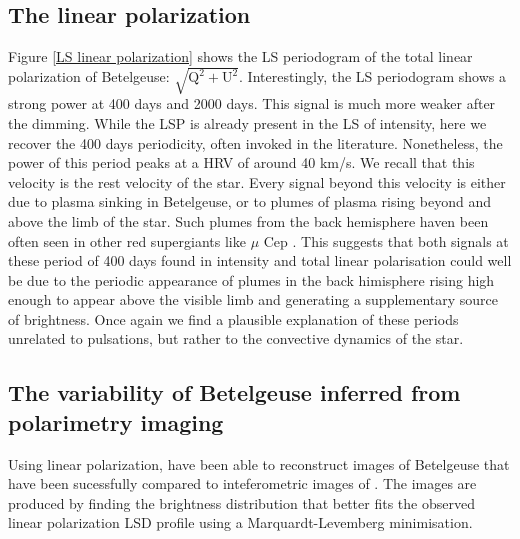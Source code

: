 \documentclass{aa}
\begin{document}
\subsection{The linear polarization}

Figure \ref{LS linear polarization} shows the LS periodogram of the total linear polarization of Betelgeuse: $\sqrt{\mathrm{Q^2+U^2}}$. 
Interestingly, the LS periodogram shows a strong power at 400 days and 2000 days. This signal is much more weaker after the dimming.
While the LSP is already present in the LS of intensity, here we recover the 400 days periodicity, often invoked in the literature. 
Nonetheless, the power of this period peaks at a HRV of around 40 km/s. We recall that this velocity is the rest velocity of the star. 
Every signal beyond this velocity is either due to  plasma sinking in Betelgeuse, or to plumes of plasma rising beyond and above the limb of the star. 
Such plumes from the back hemisphere haven been often seen in other red supergiants like $\mu$ Cep \citep{lopez_ariste_height_2023}. 
This suggests that both signals at these period of 400 days found in intensity and total linear polarisation 
could well be due to the periodic appearance of plumes in the back himisphere rising high enough to appear above
the visible limb and generating a supplementary source of brightness. Once again we find a plausible explanation 
of these periods unrelated to pulsations, but rather to the convective dynamics of the star.


\subsection{The variability of Betelgeuse inferred from polarimetry imaging}

Using linear polarization, \cite{lopez_ariste_convective_2018} have been able to reconstruct images of Betelgeuse that have been sucessfully compared 
to inteferometric images of \cite{montarges_close_2016}. The images are produced by finding the brightness distribution that better fits the observed linear 
polarization LSD profile using a Marquardt-Levemberg minimisation.
\end{document}
